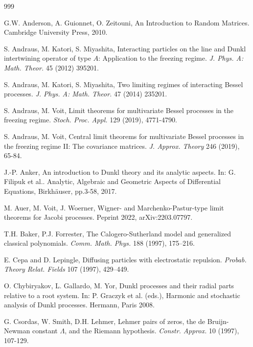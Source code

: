 \documentclass[reqno]{amsart}
\theoremstyle{plain}
\theoremstyle{definition}
\numberwithin{equation}{section}
\begin{document}
\begin{thebibliography}{999}

   G.W. Anderson, A. Guionnet, O. Zeitouni, 
  An Introduction to Random Matrices. Cambridge University Press, 2010.


 S. Andraus, M. Katori, S. Miyashita, Interacting particles on the line 
and Dunkl intertwining operator of type $A$: Application to the freezing regime. 
\textit{J. Phys. A: Math. Theor. } 45  (2012) 395201.

 S. Andraus, M. Katori, S. Miyashita, 
Two limiting regimes of interacting Bessel processes. 
 \textit{J. Phys. A: Math. Theor. } 47  (2014) 235201.

 S. Andraus, M. Voit, Limit theorems
 for multivariate Bessel processes in the freezing regime. \textit{Stoch. Proc. Appl. }
 129 (2019), 4771-4790.

 S. Andraus, M. Voit, Central limit theorems for multivariate Bessel processes
 in the freezing regime II: The covariance matrices.
\textit{J. Approx. Theory}  246 (2019), 65-84. 

 J.-P. Anker,  An introduction to Dunkl theory and its analytic aspects.
  In: G. Filipuk et al.. Analytic, Algebraic and Geometric Aspects of Differential Equations,
  Birkh{\"a}user, pp.3-58, 2017.

 M. Auer, M. Voit, J. Woerner, Wigner- and Marchenko-Pastur-type limit
  theorems for Jacobi processes. Peprint 2022, arXiv:2203.07797.

  
  T.H. Baker, P.J. Forrester, The Calogero-Sutherland model and generalized classical
polynomials. \textit{Comm. Math. Phys.} 188 (1997), 175--216.

    E. Cepa and D. Lepingle, Diffusing particles with electrostatic repulsion. \textit{ Probab. Theory
    Relat. Fields} 107 (1997), 429–449.

    
   O. Chybiryakov, L. Gallardo, M. Yor, Dunkl processes and their radial parts relative to a root system. In:
    P. Graczyk et al. (eds.), Harmonic and stochastic analysis of Dunkl processes. Hermann, Paris 2008.
    
 G. Csordas, W. Smith, D.H. Lehmer, Lehmer pairs of zeros, the de Bruijn-Newman constant $\Lambda$, and the Riemann hypothesis.
  \textit{Constr. Approx.} 10 (1997), 107-129.
 



\end{thebibliography}
\end{document}

